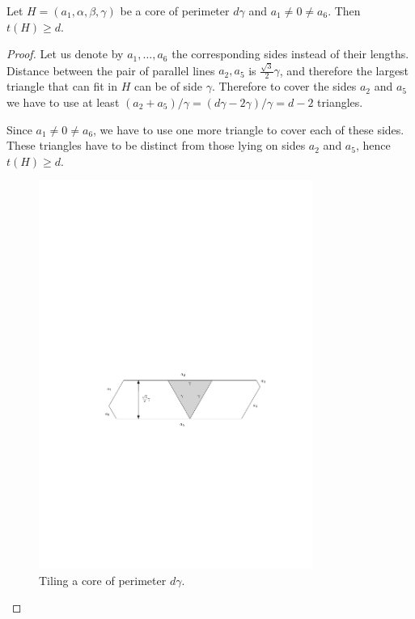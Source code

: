 \begin{lem}
\label{lem:core-dissection-bound}
Let $H = (a_1, \alpha, \beta, \gamma)$ be a core of perimeter $d\gamma$ and $a_1 \ne 0 \ne a_6$. Then $t(H) \geq d$.
\end{lem}
\begin{proof}
Let us denote by $a_1, \dots, a_6$ the corresponding sides instead of their lengths. Distance between the pair of parallel lines $a_2, a_5$ is $\frac{\sqrt{3}}{2}\gamma$, and therefore the largest triangle that can fit in $H$ can be of side $\gamma$. Therefore to cover the sides $a_2$ and $a_5$ we have to use at least $(a_2+a_5)/\gamma = (d\gamma-2\gamma)/\gamma = d-2$ triangles.

Since $a_1 \ne 0 \ne a_6$, we have to use one more triangle to cover each of these sides. These triangles have to be distinct from those lying on sides $a_2$ and $a_5$, hence $t(H) \geq d$.

\begin{figure}[htb]
\centering
\includegraphics[width=0.8\textwidth]{img/core_tiling_lower_bound.pdf}
\caption{Tiling a core of perimeter $d\gamma$.}
\label{fig:core-tiling-lower-bound}
\end{figure}\end{proof}

